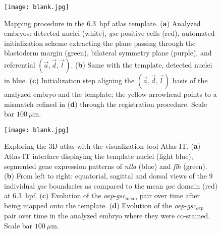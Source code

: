 \begin{figure}[h!]
    \centering
    \texttt{[image: blank.jpg]} %
    \caption{Mapping procedure in the 6.3~hpf atlas template. (\textbf{a}) Analyzed embryos: detected nuclei (white), \emph{gsc} positive cells (red), automated initialization scheme extracting the plane passing through the blastoderm margin (green), bilateral symmetry plane (purple), and referential $(\vec{a},\vec{d},\vec{l})$. (\textbf{b}) Same with the template, detected nuclei in blue. (\textbf{c}) Initialization step aligning the $(\vec{a},\vec{d},\vec{l})$ basis of the analyzed embryo and the template; the yellow arrowhead points to a mismatch refined in (\textbf{d}) through the registration procedure. Scale bar $100~\mu$m.}
    \label{fig:referentialAxis}
\end{figure}

\begin{figure*}[h!]
    \centering
    \texttt{[image: blank.jpg]} %
    \caption{Exploring the 3D atlas with the visualization tool Atlas-IT. (\textbf{a}) Atlas-IT interface displaying the template nuclei (light blue), segmented gene expression patterns of \emph{ntla} (blue) and \emph{flh} (green). (\textbf{b}) From left to right: equatorial, sagittal and dorsal views of the 9 individual \emph{gsc} boundaries as compared to the mean \emph{gsc} domain (red) at 6.3~hpf. (\textbf{c}) Evolution of the \emph{oep}-\emph{gsc}$_\mathrm{mean}$ pair over time after being mapped onto the template. (\textbf{d}) Evolution of the \emph{oep}-\emph{gsc}$_{oep}$ pair over time in the analyzed embryo where they were co-stained. Scale bar $100~\mu$m.}
    \label{fig:virtualMultiplex}
\end{figure*}

